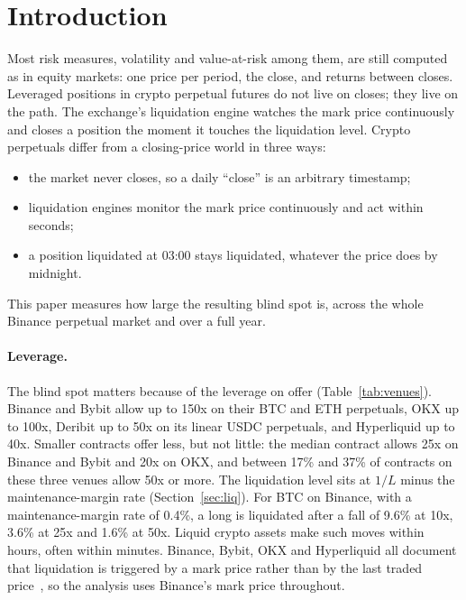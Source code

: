 \section{Introduction}

Most risk measures, volatility and value-at-risk among them, are still computed as in equity
markets: one price per period, the close, and returns between closes. Leveraged positions in crypto
perpetual futures do not live on closes; they live on the path. The exchange's liquidation engine
watches the mark price continuously and closes a position the moment it touches the liquidation
level. Crypto perpetuals differ from a closing-price world in three ways:
\begin{itemize}\itemsep0pt
\item the market never closes, so a daily ``close'' is an arbitrary timestamp;
\item liquidation engines monitor the mark price continuously and act within seconds;
\item a position liquidated at 03:00 stays liquidated, whatever the price does by midnight.
\end{itemize}
This paper measures how large the resulting blind spot is, across the whole Binance perpetual
market and over a full year.

\paragraph{Leverage.} The blind spot matters because of the leverage on offer
(Table~\ref{tab:venues}). Binance and Bybit allow up to 150x on their BTC and ETH perpetuals, OKX up
to 100x, Deribit up to 50x on its linear USDC perpetuals, and Hyperliquid up to 40x. Smaller
contracts offer less, but not little: the median contract allows 25x on Binance and Bybit and 20x on
OKX, and between 17\% and 37\% of contracts on these three venues allow 50x or more. The liquidation
level sits at $1/L$ minus the maintenance-margin rate (Section~\ref{sec:liq}). For BTC on Binance, with a
maintenance-margin rate of 0.4\%, a long is liquidated after a fall of 9.6\% at 10x, 3.6\% at 25x and
1.6\% at 50x. Liquid crypto assets make such moves within hours, often within minutes. Binance,
Bybit, OKX and Hyperliquid all document that liquidation is triggered by a mark price rather than by
the last traded price~\cite{binance-liq,bybit-mark,okx-liq,hl-liq}, so the analysis uses Binance's
mark price throughout.

\begin{table}[t]
\centering
\caption{Maximum leverage on linear (USDT- or USDC-margined) perpetuals, retrieved from each venue's
public market-data interface on 22 November 2026. \emph{BTC}: the venue's linear BTC perpetual.
\emph{Median}, $\geq$\,50x, $\leq$\,10x: across all listed contracts. Binance values are for the
first (smallest-notional) risk bracket. Sources:
\cite{binance-brackets,bybit-api,okx-api,deribit-api,hl-api}.}
\label{tab:venues}
\small

\end{table}

